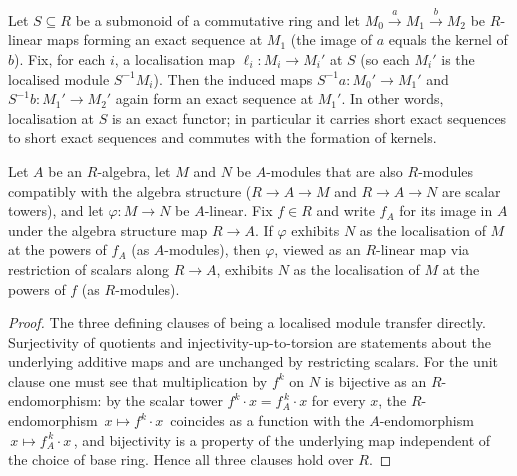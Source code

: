 \begin{lemma}
  \label{mk-lem:localized_module_map_exact_mathlib}
  \mathlibok

  Let \(S \subseteq R\) be a submonoid of a commutative ring and let
  \(M_0 \xrightarrow{\,a\,} M_1 \xrightarrow{\,b\,} M_2\) be \(R\)-linear maps forming an exact
  sequence at \(M_1\) (the image of \(a\) equals the kernel of \(b\)). Fix, for each \(i\), a
  localisation map \(\ell_i : M_i \to M_i'\) at \(S\) (so each \(M_i'\) is the localised module
  \(S^{-1} M_i\)). Then the induced maps \(S^{-1} a : M_0' \to M_1'\) and
  \(S^{-1} b : M_1' \to M_2'\) again form an exact sequence at \(M_1'\). In other words,
  localisation at \(S\) is an exact functor; in particular it carries short exact sequences to short
  exact sequences and commutes
  with the formation of kernels.
\end{lemma}

\begin{lemma}\label{mk-lem:isLocalizedModule_powers_restrictScalars_of_algebraMap}
  \leanok

  Let \(A\) be an \(R\)-algebra, let \(M\) and \(N\) be \(A\)-modules that are also \(R\)-modules
  compatibly with the algebra structure (\(R \to A \to M\) and \(R \to A \to N\) are scalar towers),
  and let \(\varphi : M \to N\) be \(A\)-linear. Fix \(f \in R\) and write \(f_A\) for its image in
  \(A\) under the algebra structure map \(R \to A\). If \(\varphi\) exhibits \(N\) as the localisation of
  \(M\) at the powers of \(f_A\) (as \(A\)-modules), then
  \(\varphi\), viewed as an \(R\)-linear map via restriction of scalars along \(R \to A\), exhibits
  \(N\) as the localisation of \(M\) at the powers of \(f\) (as \(R\)-modules).
\end{lemma}
\begin{proof}
  \leanok

The three defining clauses of being a localised module transfer directly.
  Surjectivity of quotients
  and injectivity-up-to-torsion are statements about the underlying additive maps and are unchanged by
  restricting scalars. For the unit clause one must see that multiplication by \(f^k\) on \(N\) is
  bijective as an \(R\)-endomorphism: by the scalar tower \(f^k \cdot x = f_A^{\,k} \cdot x\) for every
  \(x\), the \(R\)-endomorphism \(\,x \mapsto f^k \cdot x\,\) coincides as a function with the
  \(A\)-endomorphism \(\,x \mapsto f_A^{\,k} \cdot x\,\), and bijectivity is a property of the
  underlying map independent of the choice of base ring. Hence all three clauses hold over \(R\).
\end{proof}

